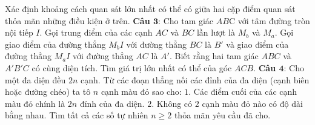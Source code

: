 \begin{multicols}{2}
	\vskip 0.1cm
	Xác định khoảng cách quan sát lớn nhất có thể có giữa hai cặp điểm quan sát thỏa mãn những điều kiện ở trên.
	\vskip 0.1cm
	\textbf{\color{cackithi}Câu $\pmb{3}$}: Cho tam giác $AB$C với tâm đường tròn nội tiếp $I$. Gọi trung điểm của các cạnh $AC$ và $BC$ lần lượt là $M_b$ và $M_a$. Gọi giao điểm của đường thẳng $M_bI$ với đường thẳng $BC$ là $B'$ và giao điểm của đường thẳng $M_aI$ với đường thẳng $AC$ là $A'$. Biết rằng hai tam giác $ABC$ và $A'B'C$ có cùng diện tích. 
	\vskip 0.1cm
	Tìm giá trị lớn nhất có thể của góc $ACB$.
	\vskip 0.1cm
	\textbf{\color{cackithi}Câu $\pmb{4}$}: Cho một đa diện đều $2n$ cạnh. Từ các đoạn thẳng nối các đỉnh của đa diện (cạnh biên hoặc đường chéo) ta tô $n$ cạnh màu đỏ sao cho:
	\vskip 0.1cm
	$1.$ Các điểm cuối của các cạnh màu đỏ chính là $2n$ đỉnh của đa diện.
	\vskip 0.1cm
	$2.$  Không có $2$ cạnh màu đỏ nào có độ dài bằng nhau.
	\vskip 0.1cm
	Tìm tất cả các số tự nhiên $n \ge 2$ thỏa mãn yêu cầu đã cho.
\end{multicols}